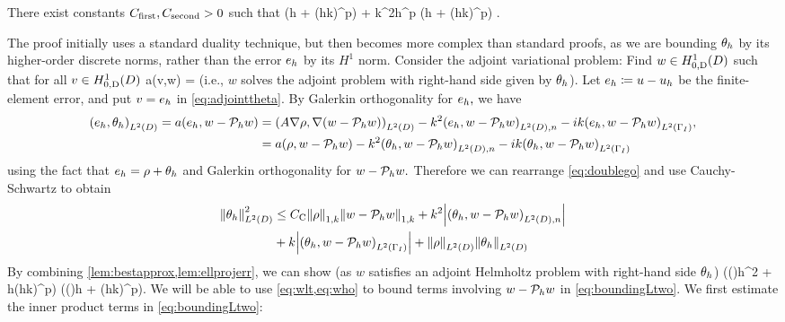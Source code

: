 \label{lem:ltthetahbound}
There exist constants $C_{\mathrm{first}}, C_{\mathrm{second}} > 0$ such that
\beq\label{eq:ltthetahbound}
\NLtD{\thetah} \leq \Cfirst \mleft(\CFEMotilde h + \CFEMttilde \CAnk (hk)^p\mright) \NW{\rho} + \Csecond k^2h^p \mleft(\CFEMotilde h + \CFEMttilde \CAnk (hk)^p\mright) .
\eeq
\ele

The proof initially uses a standard duality technique, but then becomes more complex than standard proofs, as we are bounding $\theta_{h}$ by its higher-order discrete norms, rather than the error $e_{h}$ by its $H^1$ norm.
Consider the adjoint variational problem: Find $w \in \HozDD$ such that for all $v \in \HozDD$
\beq\label{eq:adjointtheta}
a(v,w) = 
\eeq
(i.e., $w$ solves the adjoint problem with right-hand side given by $\theta_{h}$). Let $e_{h} \coloneqq u -u_{h}$ be the finite-element error, and put $v = e_{h}$ in \cref{eq:adjointtheta}. By Galerkin orthogonality for $e_{h},$ we have
\begin{align}
\IPLtD{\eh}{\thetah} = a(\eh,w-\Ph w) &= \IPLtD{A \grad \rho}{\grad(w-\Ph w)}  -k^2 \IPLtDn{\eh}{w-\Ph w} -ik \IPLtGI{\eh}{w-\Ph w},\nonumber\\
&=a(\rho,w-\Ph w) -k^2 \IPLtDn{\thetah}{w-\Ph w} -ik \IPLtGI{\thetah}{w-\Ph w}\label{eq:doublego}
\end{align}
using the fact that $e_{h} = \rho + \theta_{h}$ and Galerkin orthogonality for $w - \mathcal P_{h} w.$ Therefore we can rearrange \cref{eq:doublego} and use Cauchy-Schwartz to obtain
\begin{align}
\NLtD{\thetah}^2 &\leq \Cc \NW{\rho} \NW{w- \Ph w} + k^2 \abs{\IPLtDn{\thetah}{w- \Ph w}}\nonumber\\
&+ k \abs{\IPLtGI{\thetah}{w-\Ph w}} + \NLtD{\rho}\NLtD{\thetah}\label{eq:boundingLtwo}
\end{align}
By combining \cref{lem:bestapprox,lem:ellprojerr}, we can show (as $w$ satisfies an adjoint Helmholtz problem with right-hand side $\theta_{h}$)
\beq\label{eq:wlt}
 \leq {} \mleft(\CFEMotilde {}\mleft(\mright)h^2 + \CFEMttilde \CAnk h(hk)^p\mright)\NLtD{\thetah} \tand
\eeq
\beq\label{eq:who}
  \mleft(\CFEMotilde {}\mleft(\mright)h + \CFEMttilde \CAnk (hk)^p\mright)\NLtD{\thetah}.
\eeq
We will be able to use \cref{eq:wlt,eq:who} to bound terms involving $w - \mathcal P_{h} w$ in \cref{eq:boundingLtwo}. We first estimate the inner product terms in \cref{eq:boundingLtwo}:
